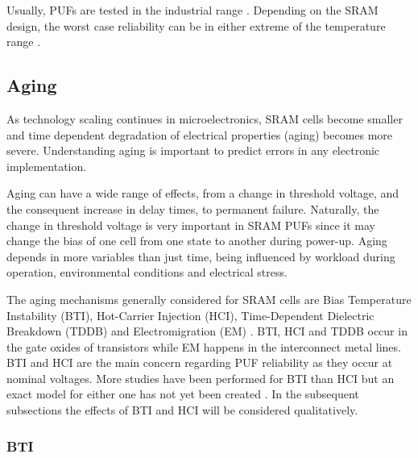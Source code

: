 Usually, PUFs are tested in the industrial range \cite{VanDerLeest2012,Schrijen2012,Cortez2013}. Depending on the SRAM design, the worst case reliability can be in either extreme of the temperature range \cite{Schrijen2012}. 

\subsection{Aging}
\label{sec:aging}

As technology scaling continues in microelectronics, SRAM cells become smaller and time dependent degradation of electrical properties (aging) becomes more severe. Understanding aging is important to predict errors in any electronic implementation. 


Aging can have a wide range of effects, from a change in threshold voltage, and the consequent increase in delay times, to permanent failure. Naturally, the change in threshold voltage is very important in SRAM PUFs since it may change the bias of one cell from one state to another during power-up. Aging depends in more variables than just time, being influenced by workload during operation, environmental conditions and electrical stress. 


 The aging mechanisms generally considered for SRAM cells are Bias Temperature Instability (BTI), Hot-Carrier Injection (HCI), Time-Dependent Dielectric Breakdown (TDDB) and Electromigration (EM) \cite{Kraak2018}. BTI, HCI and TDDB occur in the gate oxides of transistors while EM happens in the interconnect metal lines. BTI and HCI are the main concern regarding PUF reliability as they occur at nominal voltages. More studies have been performed for BTI than HCI but an exact model for either one has not yet been created \cite{Schlunder2012}. In the subsequent subsections the effects of BTI and HCI will be considered qualitatively. 


\subsubsection{BTI}

